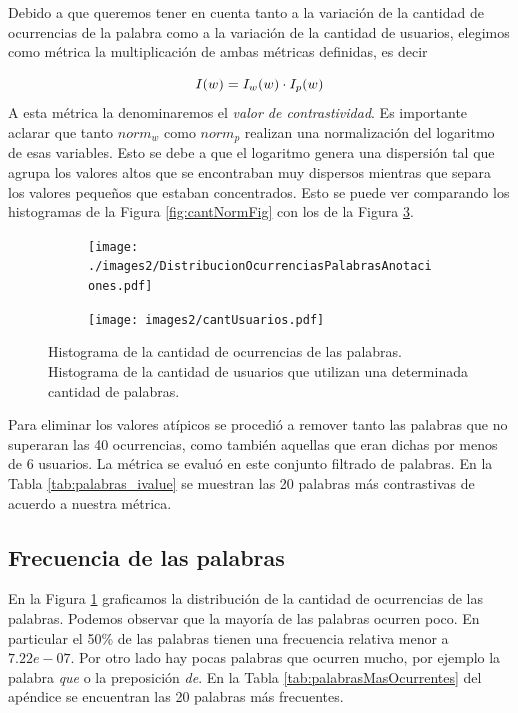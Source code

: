 Debido a que queremos tener en cuenta tanto a la variación de la cantidad de ocurrencias de la palabra como a la variación de la cantidad de usuarios, elegimos como métrica la multiplicación de ambas métricas definidas, es decir  

\begin{equation}
I(w) =  I_w (w) \cdot I_p(w)\\
\label{eq:ivalor}
\end{equation}
A esta métrica la denominaremos el \textit{valor de contrastividad}.
Es importante aclarar que tanto $norm_{w}$ como $norm_p$ realizan una normalización del logaritmo de esas variables. Esto se debe a que el logaritmo genera una dispersión tal que agrupa los valores altos que se encontraban muy dispersos mientras que separa los valores pequeños que estaban concentrados. Esto se puede ver comparando los histogramas de la Figura \ref{fig:cantNormFig} con los de la Figura \ref{fig:cantPalabrasSinNorm}.

\begin{figure}[!ht]\centering
  \begin{subfigure}[t]{0.49\textwidth}
    \texttt{[image: ./images2/DistribucionOcurrenciasPalabrasAnotaciones.pdf]}
    \caption{}
    \label{fig:cantPalabrasAnotaciones} 
   \end{subfigure}
   \begin{subfigure}[t]{0.49\textwidth}
    \texttt{[image: images2/cantUsuarios.pdf]} 
    \caption{}
    \label{fig:cantUsuarios} 
   \end{subfigure}
   \caption{ Histograma de la cantidad de ocurrencias de las palabras.  Histograma de la cantidad de usuarios que utilizan una determinada cantidad de palabras.} 
   \label{fig:cantPalabrasSinNorm} 
\end{figure}

Para eliminar los valores atípicos se procedió a remover tanto las palabras que no superaran las 40 ocurrencias, como también aquellas que eran dichas por menos de 6 usuarios. La métrica se evaluó en este conjunto filtrado de palabras. En la Tabla \ref{tab:palabras_ivalue} se muestran las 20 palabras más contrastivas de acuerdo a nuestra métrica.

\subsection{Frecuencia de las palabras}
\label{sub: frecuenciaPalabras}
En la Figura \ref{fig:cantPalabrasAnotaciones} graficamos la distribución de la cantidad de ocurrencias de las palabras. Podemos observar que la mayoría de las palabras ocurren poco. En particular el 50\% de las palabras tienen una frecuencia relativa menor a $7.22e-07$. Por otro lado hay pocas palabras que ocurren mucho, por ejemplo la palabra \textit{que} o la preposición \textit{de}. En la Tabla \ref{tab:palabrasMasOcurrentes} del apéndice se encuentran las 20 palabras más frecuentes.



